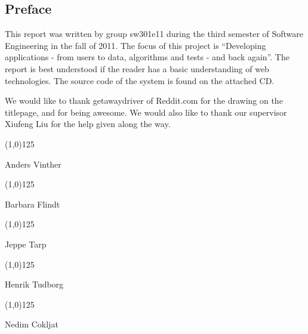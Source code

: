\subsection*{Preface}
This report was written by group sw301e11 during the third semester of Software Engineering in the fall of 2011. The focus of this project is ``Developing applications - from users to data, algorithms and tests - and back again''. The report is best understood if the reader has a basic understanding of web technologies. The source code of the system is found on the attached CD. 

We would like to thank getawaydriver of Reddit.com for the drawing on the titlepage, and for being awesome. We would also like to thank our supervisor Xiufeng Liu for the help given along the way.

\vspace{75pt}
\noindent \line(1,0){125}
		
\vspace{3pt}
Anders Vinther

\vspace{30pt}
\noindent \line(1,0){125}
		
\vspace{3pt}
Barbara Flindt

\vspace{30pt}
\noindent \line(1,0){125}
		
\vspace{3pt}
Jeppe Tarp

\vspace{30pt}
\noindent \line(1,0){125}
		
\vspace{3pt}
Henrik Tudborg

\vspace{30pt}
\noindent \line(1,0){125}
		
\vspace{3pt}
Nedim Cokljat